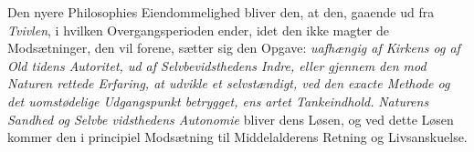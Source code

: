 Den nyere Philosophies Eiendommelighed bliver den, at
den, gaaende ud fra \emph{Tvivlen}, i hvilken Overgangsperioden
ender, idet den ikke magter de Modsætninger, den vil forene,
sætter sig den Opgave: \emph{uafhængig af Kirkens og af Old\-%
tidens Autoritet, ud af Selvbevidsthedens Indre,
eller gjennem den mod Naturen rettede Erfaring,
at udvikle et selvstændigt, ved den exacte Methode
og det uomstødelige Udgangspunkt betrygget, ens\-}%
\emph{artet Tankeindhold.} \emph{Naturens Sandhed og Selvbe\-%
vidsthedens Autonomie} bliver dens Løsen, og ved dette
Løsen kommer den i principiel Modsætning til Middelalderens
Retning og Livsanskuelse.

